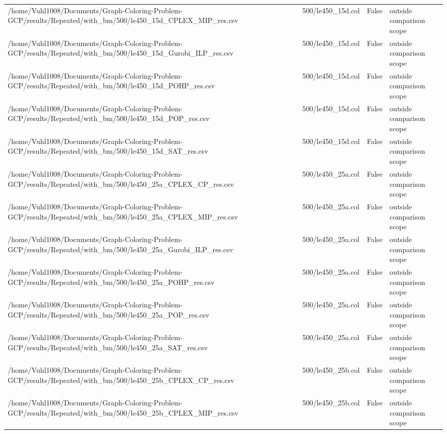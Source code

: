 \begin{table}[htbp]
\begin{tabular}{llll}
/home/Vuhl1008/Documents/Graph-Coloring-Problem-GCP/results/Repeated/with\_bm/500/le450\_15d\_CPLEX\_MIP\_res.csv & 500/le450\_15d.col & False & outside comparison scope \\
/home/Vuhl1008/Documents/Graph-Coloring-Problem-GCP/results/Repeated/with\_bm/500/le450\_15d\_Gurobi\_ILP\_res.csv & 500/le450\_15d.col & False & outside comparison scope \\
/home/Vuhl1008/Documents/Graph-Coloring-Problem-GCP/results/Repeated/with\_bm/500/le450\_15d\_POHP\_res.csv & 500/le450\_15d.col & False & outside comparison scope \\
/home/Vuhl1008/Documents/Graph-Coloring-Problem-GCP/results/Repeated/with\_bm/500/le450\_15d\_POP\_res.csv & 500/le450\_15d.col & False & outside comparison scope \\
/home/Vuhl1008/Documents/Graph-Coloring-Problem-GCP/results/Repeated/with\_bm/500/le450\_15d\_SAT\_res.csv & 500/le450\_15d.col & False & outside comparison scope \\
/home/Vuhl1008/Documents/Graph-Coloring-Problem-GCP/results/Repeated/with\_bm/500/le450\_25a\_CPLEX\_CP\_res.csv & 500/le450\_25a.col & False & outside comparison scope \\
/home/Vuhl1008/Documents/Graph-Coloring-Problem-GCP/results/Repeated/with\_bm/500/le450\_25a\_CPLEX\_MIP\_res.csv & 500/le450\_25a.col & False & outside comparison scope \\
/home/Vuhl1008/Documents/Graph-Coloring-Problem-GCP/results/Repeated/with\_bm/500/le450\_25a\_Gurobi\_ILP\_res.csv & 500/le450\_25a.col & False & outside comparison scope \\
/home/Vuhl1008/Documents/Graph-Coloring-Problem-GCP/results/Repeated/with\_bm/500/le450\_25a\_POHP\_res.csv & 500/le450\_25a.col & False & outside comparison scope \\
/home/Vuhl1008/Documents/Graph-Coloring-Problem-GCP/results/Repeated/with\_bm/500/le450\_25a\_POP\_res.csv & 500/le450\_25a.col & False & outside comparison scope \\
/home/Vuhl1008/Documents/Graph-Coloring-Problem-GCP/results/Repeated/with\_bm/500/le450\_25a\_SAT\_res.csv & 500/le450\_25a.col & False & outside comparison scope \\
/home/Vuhl1008/Documents/Graph-Coloring-Problem-GCP/results/Repeated/with\_bm/500/le450\_25b\_CPLEX\_CP\_res.csv & 500/le450\_25b.col & False & outside comparison scope \\
/home/Vuhl1008/Documents/Graph-Coloring-Problem-GCP/results/Repeated/with\_bm/500/le450\_25b\_CPLEX\_MIP\_res.csv & 500/le450\_25b.col & False & outside comparison scope \\

\end{tabular}
\end{table}
